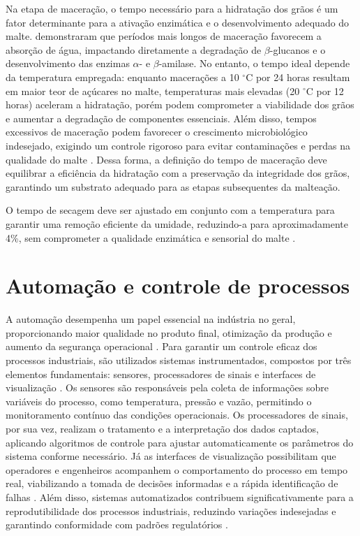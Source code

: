 Na etapa de maceração, o tempo necessário para a hidratação dos grãos é um fator determinante para a ativação enzimática e o desenvolvimento adequado do malte.  demonstraram que períodos mais longos de maceração favorecem a absorção de água, impactando diretamente a degradação de $\beta$-glucanos e o desenvolvimento das enzimas $\alpha$- e $\beta$-amilase. No entanto, o tempo ideal depende da temperatura empregada: enquanto macerações a 10 $^{\circ}$C por 24 horas resultam em maior teor de açúcares no malte, temperaturas mais elevadas (20 $^{\circ}$C por 12 horas) aceleram a hidratação, porém podem comprometer a viabilidade dos grãos e aumentar a degradação de componentes essenciais. Além disso, tempos excessivos de maceração podem favorecer o crescimento microbiológico indesejado, exigindo um controle rigoroso para evitar contaminações e perdas na qualidade do malte \cite{LUARASI2016}. Dessa forma, a definição do tempo de maceração deve equilibrar a eficiência da hidratação com a preservação da integridade dos grãos, garantindo um substrato adequado para as etapas subsequentes da malteação.

O tempo de secagem deve ser ajustado em conjunto com a temperatura para garantir uma remoção eficiente da umidade, reduzindo-a para aproximadamente 4\%, sem comprometer a qualidade enzimática e sensorial do malte \cite{LEWIS2012}.



\section{Automação e controle de processos}

A automação desempenha um papel essencial na indústria no geral, proporcionando maior qualidade no produto final, otimização da produção e aumento da segurança operacional \cite{SEBORG2016}. Para garantir um controle eficaz dos processos industriais, são utilizados sistemas instrumentados, compostos por três elementos fundamentais: sensores, processadores de sinais e interfaces de visualização \cite{BOLTON2021}. Os sensores são responsáveis pela coleta de informações sobre variáveis do processo, como temperatura, pressão e vazão, permitindo o monitoramento contínuo das condições operacionais. Os processadores de sinais, por sua vez, realizam o tratamento e a interpretação dos dados captados, aplicando algoritmos de controle para ajustar automaticamente os parâmetros do sistema conforme necessário. Já as interfaces de visualização possibilitam que operadores e engenheiros acompanhem o comportamento do processo em tempo real, viabilizando a tomada de decisões informadas e a rápida identificação de falhas \cite{BOLTON2021}. Além disso, sistemas automatizados contribuem significativamente para a reprodutibilidade dos processos industriais, reduzindo variações indesejadas e garantindo conformidade com padrões regulatórios \cite{SEBORG2016}.

